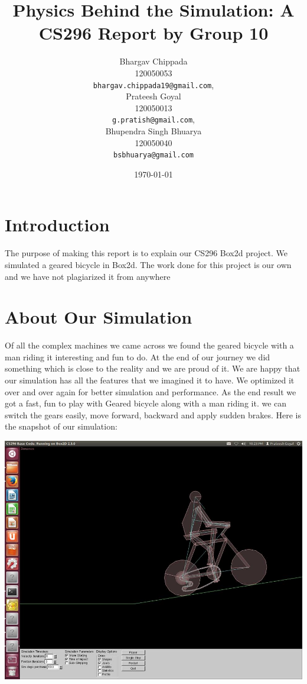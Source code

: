 \documentclass[11pt]{article}
\begin{document}
\title{Physics Behind the Simulation: A CS296 Report by Group 10}
\author{Bhargav Chippada\\
		120050053\\
		\texttt{bhargav.chippada19@gmail.com},\\
		Prateesh Goyal\\
		120050013\\
		\texttt{g.pratish@gmail.com},\\
		Bhupendra Singh Bhuarya\\
		120050040\\
		\texttt{bsbhuarya@gmail.com}}
\date{\today}
\maketitle
\section{Introduction} 
The purpose of making this report\cite{roberts} is to explain our CS296 Box2d\cite{box2d} project. We simulated a geared bicycle in Box2d. The work done for this project is our own and we have not plagiarized it from anywhere
\section{About Our Simulation}
Of all the complex machines we came across we found the geared bicycle with a man riding it interesting and fun to do. At the end of our journey we did something which is close to
the reality and we are proud of it. We are happy that our simulation has all the features that we imagined it to have. We optimized it over and over again for better simulation and performance. As the end result we got a fast, fun to play with Geared bicycle along with a man riding it. we can switch the gears easily, move forward, backward and apply sudden brakes\cite{HCVerma}. Here is the snapshot of our simulation:
		\begin{center}
		\includegraphics[scale=0.2]{pic1}
		\end{center}
\end{document}
